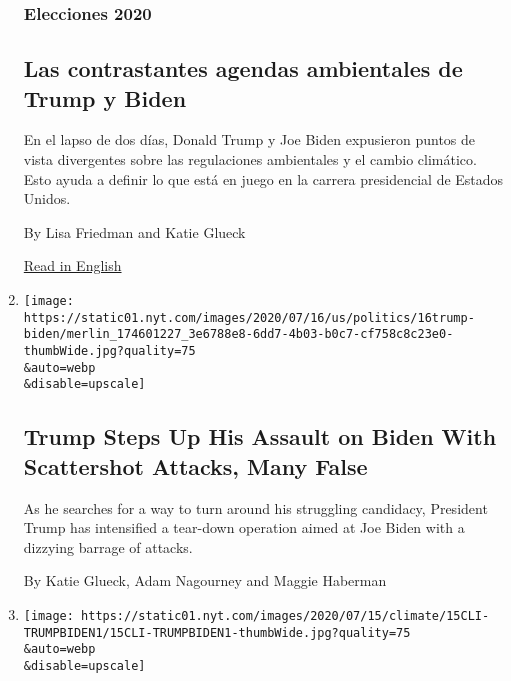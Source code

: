 \begin{enumerate}
  \hypertarget{elecciones-2020}{%
  \subsubsection{Elecciones 2020}\label{elecciones-2020}}

  \hypertarget{las-contrastantes-agendas-ambientales-de-trump-y-biden}{%
  \subsection{Las contrastantes agendas ambientales de Trump y
  Biden}\label{las-contrastantes-agendas-ambientales-de-trump-y-biden}}

  En el lapso de dos días, Donald Trump y Joe Biden expusieron puntos de
  vista divergentes sobre las regulaciones ambientales y el cambio
  climático. Esto ayuda a definir lo que está en juego en la carrera
  presidencial de Estados Unidos.

  By Lisa Friedman and Katie Glueck

  \href{https://www.nytimes.com/2020/07/15/climate/trump-biden-environment.html}{Read
  in English}
\item
  \href{/2020/07/17/us/trump-biden-2020-election.html}{}

  \texttt{[image: https://static01.nyt.com/images/2020/07/16/us/politics/16trump-biden/merlin\_174601227\_3e6788e8-6dd7-4b03-b0c7-cf758c8c23e0-thumbWide.jpg?quality=75\\\&auto=webp\\\&disable=upscale]}

  \hypertarget{trump-steps-up-his-assault-on-biden-with-scattershot-attacks-many-false}{%
  \subsection{Trump Steps Up His Assault on Biden With Scattershot
  Attacks, Many
  False}\label{trump-steps-up-his-assault-on-biden-with-scattershot-attacks-many-false}}

  As he searches for a way to turn around his struggling candidacy,
  President Trump has intensified a tear-down operation aimed at Joe
  Biden with a dizzying barrage of attacks.

  By Katie Glueck, Adam Nagourney and Maggie Haberman
\item
  \href{/2020/07/15/climate/trump-biden-environment.html}{}

  \texttt{[image: https://static01.nyt.com/images/2020/07/15/climate/15CLI-TRUMPBIDEN1/15CLI-TRUMPBIDEN1-thumbWide.jpg?quality=75\\\&auto=webp\\\&disable=upscale]}


\end{enumerate}
